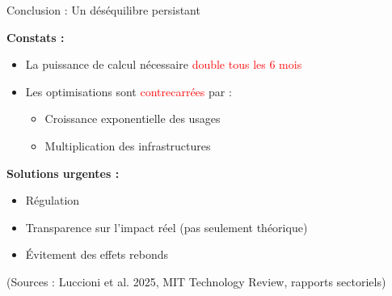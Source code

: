 \begin{frame}{Conclusion : Un déséquilibre persistant}

\textbf{Constats :}

\vspace{0.3cm}

\begin{itemize}
    \item La puissance de calcul nécessaire \textcolor{red}{double tous les 6 mois}
    \item Les optimisations sont \textcolor{red}{contrecarrées} par :
        \begin{itemize}
            \item Croissance exponentielle des usages
            \item Multiplication des infrastructures
        \end{itemize}
\end{itemize}

\vspace{0.5cm}

\textbf{Solutions urgentes :}
\begin{itemize}
    \item Régulation
    \item Transparence sur l'impact réel (pas seulement théorique)
    \item Évitement des effets rebonds
\end{itemize}

\vspace{0.3cm}

\small{(Sources : Luccioni et al. 2025, MIT Technology Review, rapports sectoriels)}

\end{frame}
